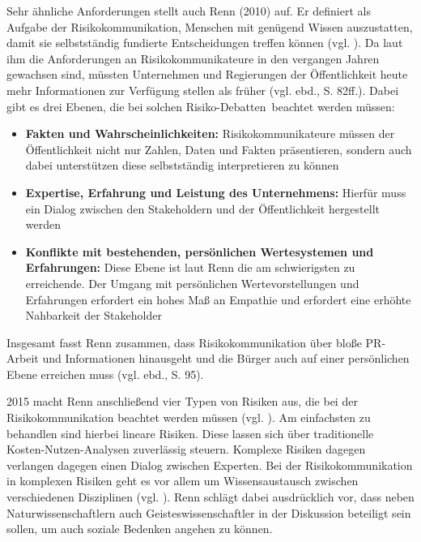 Sehr ähnliche Anforderungen stellt auch Renn (2010) auf. Er definiert als Aufgabe der Risikokommunikation, Menschen mit genügend Wissen auszustatten, damit sie selbstständig fundierte Entscheidungen treffen können (vgl. \cite[81]{renn2010risk}). Da laut ihm die Anforderungen an Risikokommunikateure in den vergangen Jahren gewachsen sind, müssten Unternehmen und Regierungen der Öffentlichkeit heute mehr Informationen zur Verfügung stellen als früher (vgl. ebd., S. 82ff.). Dabei gibt es drei Ebenen, die bei solchen \glq Risiko-Debatten\grq \, beachtet werden müssen:
\begin{itemize}
  \item \textbf{Fakten und Wahrscheinlichkeiten:} Risikokommunikateure müssen der Öffentlichkeit nicht nur Zahlen, Daten und Fakten präsentieren, sondern auch dabei unterstützen diese selbstständig interpretieren zu können
  \item \textbf{Expertise, Erfahrung und Leistung des Unternehmens:} Hierfür muss ein Dialog zwischen den Stakeholdern und der Öffentlichkeit hergestellt werden
  \item \textbf{Konflikte mit bestehenden, persönlichen Wertesystemen und Erfahrungen:} Diese Ebene ist laut Renn die am schwierigsten zu erreichende. Der Umgang mit persönlichen Wertevorstellungen und Erfahrungen erfordert ein hohes Maß an Empathie und erfordert eine erhöhte Nahbarkeit der Stakeholder
\end{itemize}

Insgesamt fasst Renn zusammen, dass Risikokommunikation über bloße PR-Arbeit und Informationen hinausgeht und die Bürger auch auf einer persönlichen Ebene erreichen muss (vgl. ebd., S. 95).

2015 macht Renn anschließend vier Typen von Risiken aus, die bei der Risikokommunikation beachtet werden müssen (vgl. \cite{renn2015stakeholder}). Am einfachsten zu behandlen sind hierbei lineare Risiken. Diese lassen sich über traditionelle Kosten-Nutzen-Analysen zuverlässig steuern. Komplexe Risiken dagegen verlangen dagegen einen Dialog zwischen Experten. Bei der Risikokommunikation in komplexen Risiken geht es vor allem um Wissensaustausch zwischen verschiedenen Disziplinen (vgl. \cite[10]{renn2015stakeholder}). Renn schlägt dabei ausdrücklich vor, dass neben Naturwissenschaftlern auch Geisteswissenschaftler in der Diskussion beteiligt sein sollen, um auch soziale Bedenken angehen zu können.

